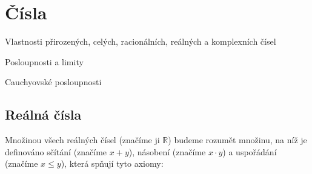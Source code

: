 \section{Čísla}

\begin{pozadavky}
\begin{pitemize}
\item Vlastnosti přirozených, celých, racionálních, reálných a komplexních čísel
\item Posloupnosti a limity
\item Cauchyovské posloupnosti
\end{pitemize}
\end{pozadavky}

\subsection{Reálná čísla}
Množinou všech reálných čísel (značíme ji $\mathbb{R}$) budeme rozumět množinu, na níž je definováno sčítání (značíme $x+y$), násobení (značíme $x\cdot y$) a uspořádání (značíme $x \le y$), která spňují tyto axiomy:

